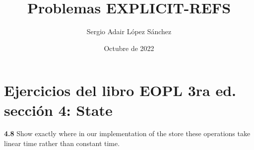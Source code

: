 \documentclass{article}
\title{Problemas EXPLICIT-REFS}
\author{Sergio Adair López Sánchez}
\date{Octubre de 2022}
\begin{document}
\maketitle

\section{Ejercicios del libro EOPL 3ra ed. sección 4: State}

\textbf{4.8}  Show exactly where in our implementation of the store these operations take linear time rather than constant time.

\begin{verbatim}

\end{verbatim}
\end{document}
